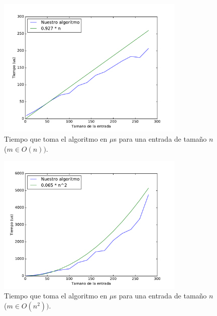 

\begin{figure}[H]
 \centering
	\includegraphics[width=0.8\textwidth]{img/exp/problema1-mejor.pdf}
	\caption{\footnotesize Tiempo que toma el algoritmo en $\mu$s para una entrada de tamaño $n$ ($m \in O(n))$.}
	\label{fig:problema1-mejor}
\end{figure}


\begin{figure}[H]
 \centering
	\includegraphics[width=0.8\textwidth]{img/exp/problema1-peor.pdf}
	\caption{\footnotesize Tiempo que toma el algoritmo en $\mu$s para una entrada de tamaño $n$ ($m \in O(n^2))$.}
	\label{fig:problema1-peor}
\end{figure}

